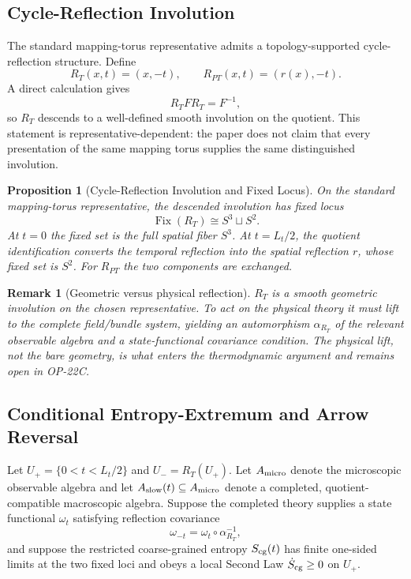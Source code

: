 \documentclass[11pt]{article}
\theoremstyle{canonmath}
\newtheorem{proposition}[theorem]{Proposition}
\newtheorem{remark}[theorem]{Remark}
\theoremstyle{canonpostulate}
\theoremstyle{canonclaim}
\def\mathcal#1{#1}%
\begin{document}
\subsection{Cycle-Reflection Involution}
\label{sec:cycle_reflection}
The standard mapping-torus representative admits a topology-supported cycle-reflection structure. Define
\begin{equation}
R_T(x,t)=(x,-t),\qquad R_{PT}(x,t)=(r(x),-t).
\end{equation}
A direct calculation gives
\begin{equation}
R_TFR_T=F^{-1},
\end{equation}
so $R_T$ descends to a well-defined smooth involution on the quotient. This statement is representative-dependent: the paper does not claim that every presentation of the same mapping torus supplies the same distinguished involution.

\begin{proposition}[Cycle-Reflection Involution and Fixed Locus] \label{prop:cycle_reflection}
On the standard mapping-torus representative, the descended involution has fixed locus
\begin{equation}
\operatorname{Fix}(R_T)\cong S^3\sqcup S^2.
\end{equation}
At $t=0$ the fixed set is the full spatial fiber $S^3$. At $t=L_t/2$, the quotient identification converts the temporal reflection into the spatial reflection $r$, whose fixed set is $S^2$. For $R_{PT}$ the two components are exchanged.
\end{proposition}
\begin{remark}[Geometric versus physical reflection]
$R_T$ is a smooth geometric involution on the chosen representative. To act on the physical theory it must lift to the complete field/bundle system, yielding an automorphism $\alpha_{R_T}$ of the relevant observable algebra and a state-functional covariance condition. The physical lift, not the bare geometry, is what enters the thermodynamic argument and remains open in OP-22C.
\end{remark}

\subsection{Conditional Entropy-Extremum and Arrow Reversal}
\label{sec:entropy_extremum}
Let $U_+=\{0<t<L_t/2\}$ and $U_-=R_T(U_+)$. Let $\mathcal A_{\rm micro}$ denote the microscopic observable algebra and let $\mathcal A_{\rm slow}(t)\subseteq\mathcal A_{\rm micro}$ denote a completed, quotient-compatible macroscopic algebra. Suppose the completed theory supplies a state functional $\omega_t$ satisfying reflection covariance
\begin{equation}
\omega_{-t}=\omega_t\circ\alpha_{R_T}^{-1},
\end{equation}
and suppose the restricted coarse-grained entropy $S_{\rm cg}(t)$ has finite one-sided limits at the two fixed loci and obeys a local Second Law $\dot S_{\rm cg}\ge0$ on $U_+$.
\end{document}
